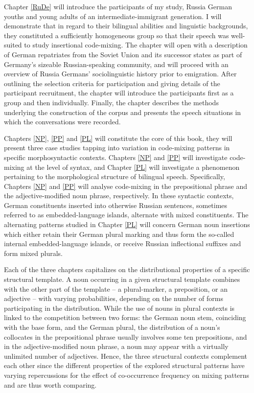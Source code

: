 Chapter \ref{RuDe} will introduce the participants of my study, Russia German youths and young adults of an intermediate-immigrant generation. I will demonstrate that in regard to their bilingual abilities and linguistic backgrounds, they constituted a sufficiently homogeneous group so that their speech was well-suited to study insertional code-mixing. The chapter will open with a description of German repatriates from the Soviet Union and its successor states as part of Germany's sizeable Russian-speaking community, and will proceed with an overview of Russia Germans' sociolinguistic history prior to emigration. After outlining the selection criteria for participation and giving details of the participant recruitment, the chapter will introduce the participants first as a group and then individually. Finally, the chapter describes the methods underlying the construction of the corpus and presents the speech situations in which the  conversations were recorded.

Chapters \ref{NP}, \ref{PP} and \ref{PL} will constitute the core of this book, they will present three case studies tapping into variation in code-mixing patterns in specific morphosyntactic contexts. Chapters \ref{NP} and \ref{PP} will investigate code-mixing at the level of syntax, and Chapter \ref{PL} will investigate a phenomenon pertaining to the morphological structure of bilingual speech. Specifically, Chapters \ref{NP} and \ref{PP} will analyse code-mixing in the prepositional phrase and the adjective-modified noun phrase, respectively. In these syntactic contexts, German constituents inserted into otherwise Russian sentences, sometimes referred to as  embedded-language islands, alternate with mixed constituents. The alternating patterns studied in Chapter \ref{PL} will concern German noun insertions which either retain their German plural marking and thus form the so-called internal embedded-language islands, or receive Russian inflectional suffixes and form mixed plurals. 

Each of the three chapters capitalizes on the  distributional properties of a specific structural template. A noun occurring in a given structural template combines with the other part of the template -- a plural-marker, a preposition, or an  adjective -- with varying probabilities, depending on the number of forms participating in the distribution. While the use of nouns in plural contexts is linked to the competition between two forms: the German noun stem,  coinciding with the base form, and the German plural, the distribution of a noun's collocates in the prepositional phrase usually involves some ten prepositions, and in the adjective-modified noun phrase, a noun may appear with a virtually unlimited number of adjectives. Hence,  the three structural contexts complement each other since the different properties of the explored structural patterns have varying repercussions for the effect of co-occurrence frequency on mixing patterns and are thus worth comparing.

